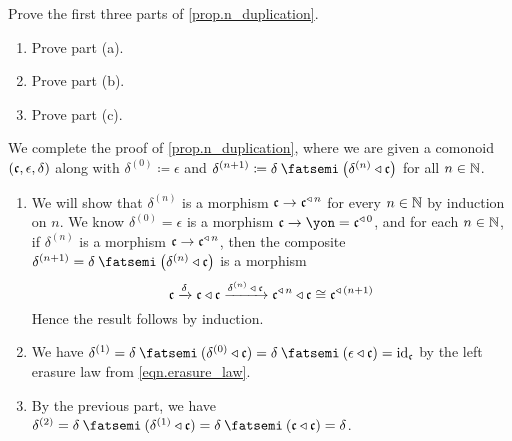 \documentclass[Book-Poly]{subfiles}
\begin{document}
\begin{exercise} \label{exc.n_duplication}
Prove the first three parts of \cref{prop.n_duplication}. %
\begin{enumerate}
    \item Prove part (a).
    \item Prove part (b).
    \item Prove part (c).\qedhere
\end{enumerate}
\begin{solution}
We complete the proof of \cref{prop.n_duplication}, where we are given a comonoid $(\mathfrak{c},\epsilon,\delta)$ along with $\delta^{(0)}\coloneqq\epsilon$ and $\delta^{(n+1)}\coloneqq\delta\then\left(\delta^{(n)}\tri\car{c}\right)$ for all $n\in\mathbb{N}$.
\begin{enumerate}
    \item We will show that $\delta^{(n)}$ is a morphism $\mathfrak{c}\to\mathfrak{c}^{\mathbin{\triangleleft}\,n}$ for every $n\in\mathbb{N}$ by induction on $n$.
    We know $\delta^{(0)}=\epsilon$ is a morphism $\car{c}\to\yon=\car{c}\tripow0$, and for each $n\in\mathbb{N}$, if $\delta^{(n)}$ is a morphism $\mathfrak{c}\to\mathfrak{c}^{\mathbin{\triangleleft}\,n}$, then the composite $\delta^{(n+1)}=\delta\then\left(\delta^{(n)}\tri\car{c}\right)$ is a morphism
    \[
        \mathfrak{c}\xrightarrow{\delta}\mathfrak{c}\mathbin{\triangleleft}\mathfrak{c}\xrightarrow{\delta^{(n)}\:\mathbin{\triangleleft}\:\mathfrak{c}}\mathfrak{c}^{\mathbin{\triangleleft}\,n}\mathbin{\triangleleft}\mathfrak{c}\cong\mathfrak{c}^{\mathbin{\triangleleft}\,(n+1)}
    \]
    Hence the result follows by induction.

    \item We have $\delta^{(1)}=\delta\then(\delta^{(0)}\tri\car{c})=\delta\then(\epsilon\tri\car{c})=\id_\car{c}$ by the left erasure law from \eqref{eqn.erasure_law}.

    \item By the previous part, we have $\delta^{(2)}=\delta\then(\delta^{(1)}\tri\car{c})=\delta\then(\car{c}\tri\car{c})=\delta$.
\end{enumerate}
\end{solution}
\end{exercise}
\end{document}
